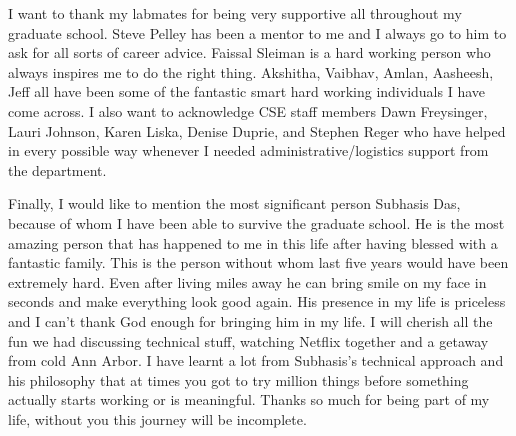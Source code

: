 I want to thank my labmates for being very supportive all throughout my graduate
school. Steve Pelley has been a mentor to me and I always go to him to ask for
all sorts of career advice. Faissal Sleiman is a hard working person who always
inspires me to do the right thing. Akshitha, Vaibhav, Amlan, Aasheesh, Jeff all
have been some of the fantastic smart hard working individuals I have come
across. I also want to acknowledge CSE staff members Dawn Freysinger, Lauri
Johnson, Karen Liska, Denise Duprie, and Stephen Reger who have helped in every
possible way whenever I needed administrative/logistics support from the
department.

Finally, I would like to mention the most significant person Subhasis Das,
because of whom I have been able to survive the graduate school. He is the most
amazing person that has happened to me in this life after having blessed with a
fantastic family. This is the person without whom last five years would have been
extremely hard. Even after living miles away he can bring smile on my face in
seconds and make everything look good again. His presence in my life is
priceless and I can't thank God enough for bringing him in my life.  I will
cherish all the fun we had discussing technical stuff, watching Netflix
together and a getaway from cold Ann Arbor. I have learnt a lot from Subhasis's
technical approach and his philosophy that at times you got to try million
things before something actually starts working or is meaningful. Thanks so much
for being part of my life, without you this journey will be incomplete.
